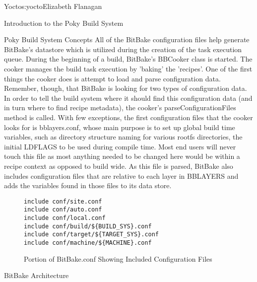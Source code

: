 \begin{aosachapter}{Yocto}{s:yocto}{Elizabeth Flanagan}
\begin{aosasect1}{Introduction to the Poky Build System}
\begin{aosasect2}{Poky Build System Concepts}
All of the BitBake configuration files help generate BitBake's
datastore which is utilized during the creation of the task execution
queue. During the beginning of a build, BitBake's BBCooker class is
started. The cooker manages the build task execution by 'baking' the
'recipes'. One of the first things the cooker does is attempt to load
and parse configuration data. Remember, though, that BitBake is
looking for two types of configuration data. In order to tell the
build system where it should find this configuration data (and in turn
where to find recipe metadata), the cooker's parseConfigurationFiles
method is called.  With few exceptions, the first configuration files
that the cooker looks for is bblayers.conf, whose main purpose is to
set up global build time variables, such as directory structure naming
for various rootfs directories, the initial LDFLAGS to be used during
compile time. Most end users will never touch this file as most
anything needed to be changed here would be within a recipe context as
opposed to build wide. As this file is parsed, BitBake also includes
configuration files that are relative to each layer in BBLAYERS and
adds the variables found in those files to its data store.

\begin{figure}
\begin{verbatim}
include conf/site.conf
include conf/auto.conf
include conf/local.conf
include conf/build/${BUILD_SYS}.conf
include conf/target/${TARGET_SYS}.conf
include conf/machine/${MACHINE}.conf
\end{verbatim}
\caption{Portion of BitBake.conf Showing Included Configuration Files}
\label{fig.yocto.included}
\end{figure}

\end{aosasect2}

\end{aosasect1}

\begin{aosasect1}{BitBake Architecture}


\end{aosasect1}
\end{aosachapter}
